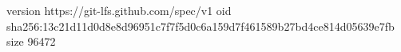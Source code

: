 version https://git-lfs.github.com/spec/v1
oid sha256:13c21d11d0d8e8d96951c7f7f5d0c6a159d7f461589b27bd4ce814d05639e7fb
size 96472
